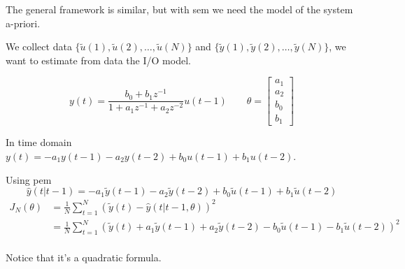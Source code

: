 The general framework is similar, but with \gls{sem} we need the model of the system a-priori.
\begin{exa}
    We collect data $\{ \tilde{u}(1), \tilde{u}(2), \dots, \tilde{u}(N) \}$ and $\{ \tilde{y}(1), \tilde{y}(2), \dots, \tilde{y}(N) \}$, we want to estimate from data the I/O model.

    \[
        y(t) = \frac{b_0 + b_1z^{-1}}{1+a_1z^{-1} + a_2z^{-2}}u(t-1) \qquad \theta = \begin{bmatrix}
            a_1 \\ a_2 \\ b_0 \\ b_1
        \end{bmatrix}
    \]

    In time domain $y(t) = -a_1y(t-1)-a_2y(t-2)+b_0u(t-1)+b_1u(t-2)$.

    Using \gls{pem}
    \[
        \hat{y}(t|t-1) = -a_1\tilde{y}(t-1)-a_2\tilde{y}(t-2)+b_0\tilde{u}(t-1)+b_1\tilde{u}(t-2)
    \]
    \begin{align*}
        J_N(\theta) &= \frac{1}{N}\sum_{t=1}^N \left( \tilde{y}(t) - \hat{y}(t|t-1, \theta) \right)^2 \\
        &= \frac{1}{N}\sum_{t=1}^N \left( \tilde{y}(t) +a_1\tilde{y}(t-1)+a_2\tilde{y}(t-2)-b_0\tilde{u}(t-1)-b_1\tilde{u}(t-2) \right)^2 \\
    \end{align*}

    Notice that it's a quadratic formula.

    \begin{figure}[H]
        \begin{minipage}[t]{0.5\textwidth}
            \centering
\end{minipage}
\end{figure}
\end{exa}
